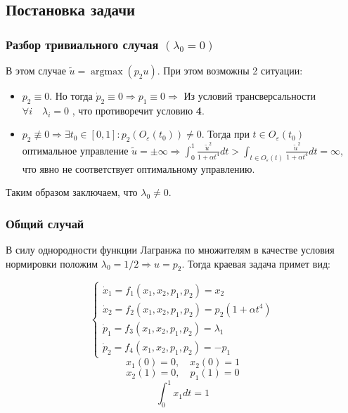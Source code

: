 \documentclass[a4paper,12pt]{article}
\DeclareMathOperator*{\argmax}{argmax}
\begin{document}
\subsection*{Постановка задачи}

\subsubsection*{Разбор тривиального случая \((\lambda_0=0)\)}

В этом случае \(\tilde{u}=\argmax(p_2 u)\). При этом возможны 2
ситуации:

\begin{itemize}
\item
  \(p_2 \equiv 0\). Но тогда
  \(\dot{p}_2\equiv 0 \Rightarrow p_1 \equiv 0 \Rightarrow\) Из условий
  трансверсальности \(\forall i \quad \lambda_i=0\) , что противоречит
  условию \textbf{4}.
\item
  \(p_2 \not\equiv 0 \Rightarrow \exists t_0 \in [0, 1] : p_2\left(O_{\varepsilon}(t_0)\right) \neq 0\).
  Тогда при \(t\in O_{\varepsilon}(t_0)\) оптимальное управление
  \(\tilde{u}=\pm\infty \Rightarrow \int_0^1 \frac{\tilde{u}^2}{1+\alpha t^4}dt > \int_{t\in O_\varepsilon(t)}\frac{\tilde{u}^2}{1+\alpha t^4}dt=\infty\),
  что явно не соответствует оптимальному управлению.
\end{itemize}

Таким образом заключаем, что \(\lambda_0 \neq 0\).

\subsubsection*{Общий случай}

В силу однородности функции Лагранжа по множителям в качестве условия
нормировки положим \(\lambda_0=1/2 \Rightarrow u=p_2\). Тогда краевая
задача примет вид:

\begin{equation}
  \label{common_system}
  \begin{cases}
    \dot{x}_1=f_1(x_1,x_2,p_1,p_2)=x_2\\
    \dot{x}_2=f_2(x_1,x_2,p_1,p_2)=p_2\left(1+\alpha t^4\right) \\
    \dot{p}_1=f_3(x_1,x_2,p_1,p_2)=\lambda_1\\
    \dot{p}_2=f_4(x_1,x_2,p_1,p_2)=-p_1
    \end{cases}
\end{equation}
\begin{equation}
  \label{left_conditions}
  x_1(0)=0, \quad x_2(0)=1
\end{equation}
\begin{equation}
  \label{right_conditions}
  x_2(1)=0, \quad p_1(1)=0
\end{equation}
\begin{equation}
  \label{integral_condition}
  \int_0^1x_1dt=1
\end{equation}
\end{document}
